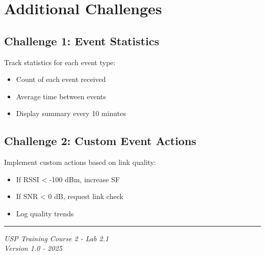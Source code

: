 \documentclass[11pt,a4paper]{article}
\begin{document}
\section{Additional Challenges}

\subsection{Challenge 1: Event Statistics}

Track statistics for each event type:
\begin{itemize}
    \item Count of each event received
    \item Average time between events
    \item Display summary every 10 minutes
\end{itemize}

\subsection{Challenge 2: Custom Event Actions}

Implement custom actions based on link quality:
\begin{itemize}
    \item If RSSI < -100 dBm, increase SF
    \item If SNR < 0 dB, request link check
    \item Log quality trends
\end{itemize}

\vfill

\noindent\rule{\textwidth}{0.4pt}
\begin{center}
\textit{USP Training Course 2 - Lab 2.1}\\
\textit{Version 1.0 - 2025}
\end{center}
\end{document}
